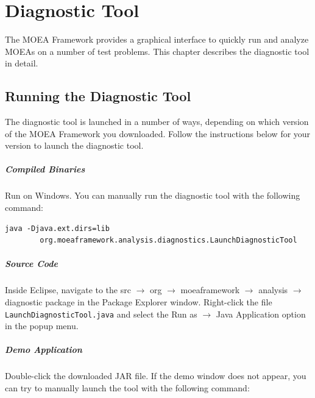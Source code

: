 %
%

\chapter{Diagnostic Tool}
The MOEA Framework provides a graphical interface to quickly run and analyze MOEAs on a number of test problems.  This chapter describes the diagnostic tool in detail.

\section{Running the Diagnostic Tool}
The diagnostic tool is launched in a number of ways, depending on which version of the MOEA Framework you downloaded.  Follow the instructions below for your version to launch the diagnostic tool.

\paragraph{Compiled Binaries}
Run  on Windows.  You can manually run the diagnostic tool with the following command:

\begin{lstlisting}[language=Plaintext]
java -Djava.ext.dirs=lib
		org.moeaframework.analysis.diagnostics.LaunchDiagnosticTool
\end{lstlisting}

\paragraph{Source Code}
Inside Eclipse, navigate to the src $\rightarrow$ org $\rightarrow$ moeaframework $\rightarrow$ analysis $\rightarrow$ diagnostic package in the Package Explorer window.  Right-click the file \texttt{LaunchDiagnosticTool.java} and select the Run as $\rightarrow$ Java Application option in the popup menu.

\paragraph{Demo Application}
Double-click the downloaded JAR file.  If the demo window does not appear, you can try to manually launch the tool with the following command:

